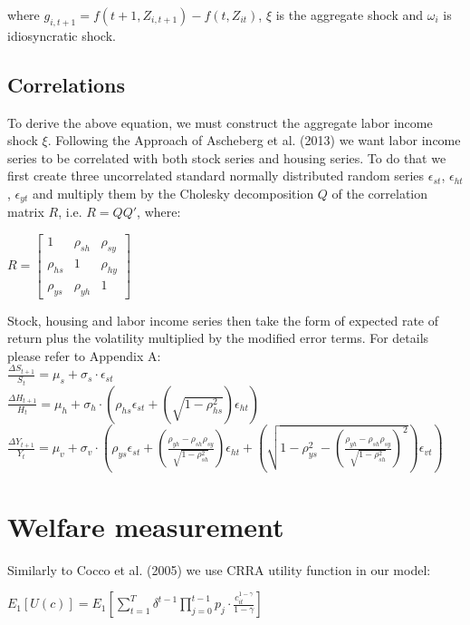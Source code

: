 where $g_{i,t+1} = f(t+1, Z_{i,t+1}) - f(t, Z_{it})$, $\xi$ is the aggregate shock and $\omega_{i}$ is idiosyncratic shock.


\subsection{Correlations}

To derive the above equation, we must construct the aggregate labor income shock $\xi$. Following the Approach of Ascheberg et al. (2013) we want labor income series to be correlated with both stock series and housing series. To do that we first create three uncorrelated standard normally distributed random series $\epsilon_{st}$, $\epsilon_{ht}$, $\epsilon_{yt}$ and multiply them by the Cholesky decomposition $Q$ of the correlation matrix $R$, i.e. $R = QQ'$, where:

\begin{center}
	$R = \begin{bmatrix}
					1 & \rho_{sh} & \rho_{sy} \\
					\rho_{hs} & 1 & \rho_{hy} \\
					\rho_{ys} & \rho_{yh} & 1
			\end{bmatrix}
	$
\end{center}

Stock, housing and labor income series then take the form of expected rate of return plus the volatility multiplied by the modified error terms. For details please refer to Appendix A:\\
$\frac{\Delta S_{t+1}}{S_t} = \mu_s + \sigma_s \cdot \epsilon_{st}$\\
$\frac{\Delta H_{t+1}}{H_t} = \mu_h + \sigma_h \cdot \left(\rho_{hs}\epsilon_{st} + (\sqrt{1-\rho^2_{hs}})\epsilon_{ht}\right)$\\
$\frac{\Delta Y_{t+1}}{Y_t} = \mu_v + \sigma_v \cdot \left(\rho_{ys}\epsilon_{st} + \left(\frac{\rho_{yh} - \rho_{sh}\rho_{sy}}{\sqrt{1-\rho^2_{sh}}}\right)\epsilon_{ht} + \left(\sqrt{1-\rho^2_{ys}-(\frac{\rho_{yh} - \rho_{sh}\rho_{sy}}{\sqrt{1-\rho^2_{sh}}})^2}\right)\epsilon_{vt}\right)$

\section{Welfare measurement}
Similarly to Cocco et al. (2005) we use CRRA utility function in our model:

\begin{center}
	$E_1[U(c)] = E_1 \left[\displaystyle\sum^T_{t=1} \delta^{t-1} \displaystyle\prod^{t-1}_{j=0} p_j \cdot \frac{c^{1-\gamma}_{it}}{1-\gamma}\right]$
\end{center}

